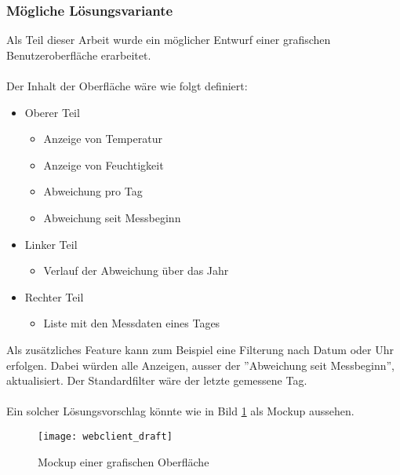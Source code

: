 \subsubsection{Mögliche Lösungsvariante}
Als Teil dieser Arbeit wurde ein möglicher Entwurf einer grafischen Benutzeroberfläche erarbeitet.\\
\\
Der Inhalt der Oberfläche wäre wie folgt definiert:
\begin{itemize}
    \item Oberer Teil \begin{itemize}
        \item Anzeige von Temperatur
        \item Anzeige von Feuchtigkeit
        \item Abweichung pro Tag
        \item Abweichung seit Messbeginn
    \end{itemize}
    \item Linker Teil
    \begin{itemize}
        \item Verlauf der Abweichung über das Jahr
    \end{itemize}
    \item Rechter Teil
    \begin{itemize}
        \item Liste mit den Messdaten eines Tages
    \end{itemize}
\end{itemize}
Als zusätzliches Feature kann zum Beispiel eine Filterung nach Datum oder Uhr erfolgen.
Dabei würden alle Anzeigen, ausser der ''Abweichung seit Messbeginn'', aktualisiert.
Der Standardfilter wäre der letzte gemessene Tag.\\
\\
Ein solcher Lösungsvorschlag könnte wie in Bild \ref{fig:ui_draft} als Mockup aussehen.

\begin{figure}[H]
    \centering
    \texttt{[image: webclient\_draft]}
    \caption{Mockup einer grafischen Oberfläche}
    \label{fig:ui_draft}
\end{figure}